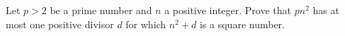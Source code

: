 Let $p>2$ be a prime number and $n$ a positive integer. Prove that $pn^2$ has at most one positive divisor $d$ for which $n^2+d$ is a square number.